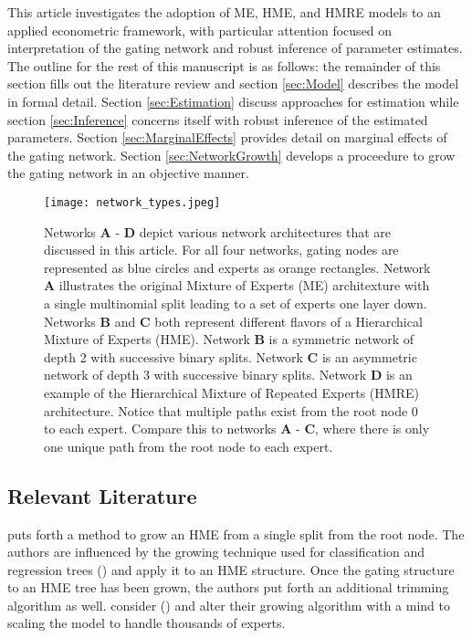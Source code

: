 \documentclass[12pt]{article}
\begin{document}
\bigskip

This article investigates the adoption of ME, HME, and HMRE models to an applied
econometric framework, with particular attention focused on interpretation of
the gating network and robust inference of parameter estimates. The outline for the
rest of this manuscript is as follows: the remainder of this section
fills out the literature review and section \ref{sec:Model} describes
the model in formal detail. Section \ref{sec:Estimation} discuss approaches
for estimation while section \ref{sec:Inference} concerns itself with robust
inference of the estimated parameters. Section \ref{sec:MarginalEffects}
provides detail on marginal effects of the gating network. Section
\ref{sec:NetworkGrowth} develops a proceedure to grow the gating network
in an objective manner. 

\begin{figure}[ht]
  \centering
  \texttt{[image: network\_types.jpeg]}
  \caption{Networks \textbf{A} - \textbf{D} depict various network
  architectures that are discussed in this article. For all four networks,
  gating nodes are represented as blue circles and experts as orange
  rectangles. Network \textbf{A} illustrates the original Mixture of
  Experts (ME) architexture with a single multinomial split leading
  to a set of experts one layer down. Networks \textbf{B} and \textbf{C} both
  represent different flavors of a Hierarchical Mixture of Experts (HME). Network
  \textbf{B} is a symmetric network of depth 2 with successive binary splits.
  Network \textbf{C} is an asymmetric network of depth 3 with successive
  binary splits. Network \textbf{D} is an example of the Hierarchical
  Mixture of Repeated Experts (HMRE) architecture. Notice that multiple paths
  exist from the root node $0$ to each expert. Compare this to networks
  \textbf{A} - \textbf{C}, where there is only one unique path from the root
  node to each expert.}
  \label{fig:network_comparison}
\end{figure}


\subsection{Relevant Literature}

\cite{WaterhouseRobinson1995} puts forth a method to grow an HME from a 
single split from the root node. The authors are influenced by the growing
technique used for classification and regression trees (\cite{CART1984}) and
apply it to an HME structure. Once the gating structure to an HME tree has
been grown, the authors put forth an additional trimming algorithm as well.
\cite{FFW1997} consider (\cite{WaterhouseRobinson1995}) and alter their
growing algorithm with a mind to scaling the model to handle thousands of
experts.
\end{document}
